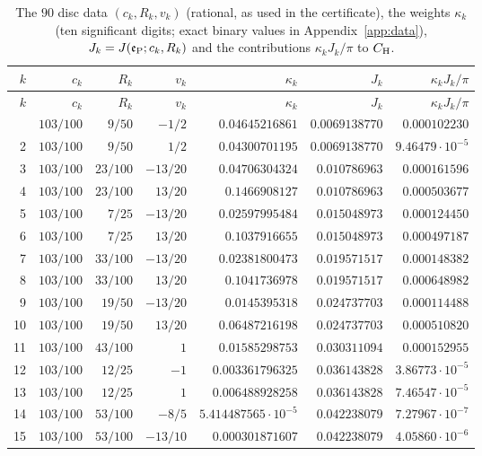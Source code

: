 \documentclass[11pt,reqno]{amsart}
\numberwithin{equation}{section}
\theoremstyle{definition}
\theoremstyle{remark}
\begin{document}
\small
\begin{center}
\begin{longtable}{@{}rrrrrrr@{}}\caption{The $90$ disc data $(c_k,R_k,v_k)$ (rational, as used in the certificate), the weights $\kappa_k$ (ten significant digits; exact binary values in Appendix~\ref{app:data}), $J_k=J(\mathfrak e_{\rm P};c_k,R_k)$ and the contributions $\kappa_kJ_k/\pi$ to $C_{\rm H}$.}\label{tab:hybrid_discs}\\
\toprule $k$ & $c_k$ & $R_k$ & $v_k$ & $\kappa_k$ & $J_k$ & $\kappa_kJ_k/\pi$\\\midrule\endfirsthead
\toprule $k$ & $c_k$ & $R_k$ & $v_k$ & $\kappa_k$ & $J_k$ & $\kappa_kJ_k/\pi$\\\midrule\endhead
\bottomrule\endfoot
1 & $103/100$ & $9/50$ & $-1/2$ & $0.04645216861$ & $0.0069138770$ & $0.000102230$\\
2 & $103/100$ & $9/50$ & $1/2$ & $0.04300701195$ & $0.0069138770$ & $9.46479\cdot10^{-5}$\\
3 & $103/100$ & $23/100$ & $-13/20$ & $0.04706304324$ & $0.010786963$ & $0.000161596$\\
4 & $103/100$ & $23/100$ & $13/20$ & $0.1466908127$ & $0.010786963$ & $0.000503677$\\
5 & $103/100$ & $7/25$ & $-13/20$ & $0.02597995484$ & $0.015048973$ & $0.000124450$\\
6 & $103/100$ & $7/25$ & $13/20$ & $0.1037916655$ & $0.015048973$ & $0.000497187$\\
7 & $103/100$ & $33/100$ & $-13/20$ & $0.02381800473$ & $0.019571517$ & $0.000148382$\\
8 & $103/100$ & $33/100$ & $13/20$ & $0.1041736978$ & $0.019571517$ & $0.000648982$\\
9 & $103/100$ & $19/50$ & $-13/20$ & $0.0145395318$ & $0.024737703$ & $0.000114488$\\
10 & $103/100$ & $19/50$ & $13/20$ & $0.06487216198$ & $0.024737703$ & $0.000510820$\\
11 & $103/100$ & $43/100$ & $1$ & $0.01585298753$ & $0.030311094$ & $0.000152955$\\
12 & $103/100$ & $12/25$ & $-1$ & $0.003361796325$ & $0.036143828$ & $3.86773\cdot10^{-5}$\\
13 & $103/100$ & $12/25$ & $1$ & $0.006488928258$ & $0.036143828$ & $7.46547\cdot10^{-5}$\\
14 & $103/100$ & $53/100$ & $-8/5$ & $5.414487565\cdot10^{-5}$ & $0.042238079$ & $7.27967\cdot10^{-7}$\\
15 & $103/100$ & $53/100$ & $-13/10$ & $0.000301871607$ & $0.042238079$ & $4.05860\cdot10^{-6}$\\

\end{longtable}
\end{center}
\end{document}
